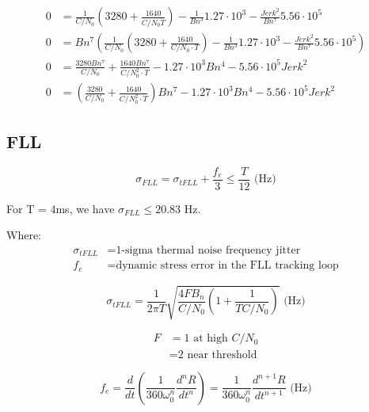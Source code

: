 \begin{align*}
0&=\frac{1}{C/N_0} \left(3280 + \frac{1640}{C/N_0 \dot T}\right) - \frac{1}{Bn^{3}} 1.27 \cdot 10^{3} - \frac{Jerk^{2}}{Bn^{7}} 5.56 \cdot 10^{5}\\
0&=Bn^{7} \left(\frac{1}{C/N_0} \left(3280 + \frac{1640}{C/N_0 \cdot T}\right) - \frac{1}{Bn^{3}} 1.27 \cdot 10^{3} - \frac{Jerk^{2}}{Bn^{7}} 5.56 \cdot 10^{5}\right)\\
0&=\frac{3280 Bn^{7}}{C/N_0} + \frac{1640 Bn^{7}}{C/N_0^{2} \cdot T} - 1.27 \cdot 10^{3} Bn^{4} - 5.56 \cdot 10^{5} Jerk^{2}\\
0&=(\frac{3280}{C/N_0} + \frac{1640}{C/N_0^{2} \cdot T})Bn^{7}  - 1.27 \cdot 10^{3} Bn^{4} - 5.56 \cdot 10^{5} Jerk^{2}
\end{align*}

\subsection{FLL}


\begin{comment}
Talk about this
5.6.2 FLL Tracking Loop Measurement Errors

Generate figure 5.24
Generate figure 5.25

Also talk about section 5.6.2
\end{comment}

\begin{equation}\label{eq:FLLJitter}
\sigma_{FLL} =  \sigma_{tFLL} + \frac{f_e}{3} \leq \frac{T}{12} \text{ (Hz)}
\end{equation}

For T = 4ms, we have $\sigma_{FLL} \leq 20.83$ Hz.

Where:
\begin{align*}
\sigma_{tFLL} &= \text{1-sigma thermal noise frequency jitter}\\
f_e &= \text{dynamic stress error in the FLL tracking loop}
\end{align*}


\begin{equation}
\sigma_{tFLL} = \frac{1}{2 \pi T} \sqrt{ \frac{4FB_n}{C/N_0}(1 + \frac{1}{TC/N_0})} \text{ (Hz)}
\end{equation}

\begin{align*}
F &= \text{1 at high } C/N_0\\
  &= \text{2 near threshold}
\end{align*}


\begin{equation}
f_e = \frac{d}{dt}(\frac{1}{360 \omega^n_0}\frac{d^nR}{dt^n}) = \frac{1}{360\omega^n_0} \frac{d^{n+1}R}{dt^{n+1}} \text{ (Hz)}
\end{equation}


